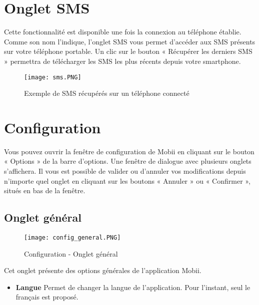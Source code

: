 \documentclass{koala-fr}
\begin{document}
\section{Onglet SMS}
Cette fonctionnalité est disponible une fois la connexion au téléphone établie.
\newline
\newline
Comme son nom l'indique, l'onglet SMS vous permet d'accéder aux SMS présents sur votre téléphone portable. Un clic sur le bouton « Récupérer les derniers SMS » permettra de télécharger les SMS les plus récents depuis votre smartphone.

\begin{figure}[!ht]
  \center
  \texttt{[image: sms.PNG]}
  \caption{Exemple de SMS récupérés sur un téléphone connecté}
\end{figure}

\thispagestyle{fancy}
\newpage

\section{Configuration}
Vous pouvez ouvrir la fenêtre de configuration de Mobii en cliquant sur le bouton « Options » de la barre d’options. Une fenêtre de dialogue avec plusieurs onglets s’affichera.
\newline
\newline
Il vous est possible de valider ou d’annuler vos modifications depuis n’importe quel onglet en cliquant sur les boutons « Annuler » ou « Confirmer », situés en bas de la fenêtre.

\subsection{Onglet général}

\begin{figure}[!ht]
  \center
  \texttt{[image: config\_general.PNG]}
  \caption{Configuration - Onglet général}
\end{figure}

Cet onglet présente des options générales de l’application Mobii.

\begin{itemize}
\item\textbf{Langue}
\newline
Permet de changer la langue de l’application. Pour l’instant, seul le français est proposé.
\end{itemize}

\thispagestyle{fancy}
\newpage
\end{document}
